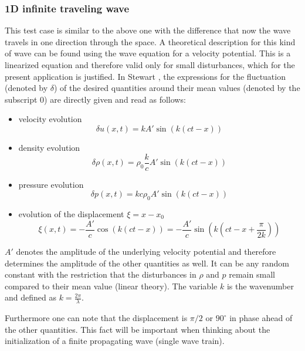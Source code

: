\documentclass{report}
\begin{document}
\subsubsection{1D infinite traveling wave}
This test case is similar to the above one with the difference that now the wave travels in one direction through the space. A theoretical description for this kind of wave can be found using the wave equation for a velocity potential. This is a linearized equation and therefore valid only for small disturbances, which for the present application is justified.
In Stewart \cite{Stewart1930}, the expressions for the fluctuation (denoted by $\delta$) of the desired quantities around their mean values (denoted by the subscript $0$) are directly given and read as follows:
\begin{itemize}
\item velocity evolution 
\begin{equation}
\label{eq:1DWaveDetla_u}
 \delta u(x,t)=k A' \sin(k(ct-x))
\end{equation}
\item density evolution 
\begin{equation}
 \delta \rho(x,t)=\rho_0\frac{k}{c} A'  \sin(k(ct-x))
\end{equation}
\item pressure evolution 
\begin{equation}
 \delta p(x,t)=k c \rho_0 A'  \sin(k(ct-x))
\end{equation}
\item evolution of the displacement $\xi=x-x_0$
\begin{equation}
\label{eq:1DWaveDisplacement}
 \xi(x,t)=-\frac{A' }{c} \cos(k(ct-x))=-\frac{A' }{c} \sin\left(k\left(ct-x+\frac{\pi}{2k}\right)\right)
\end{equation}

\end{itemize}

$A' $ denotes the amplitude of the underlying velocity potential and therefore determines the amplitude of the other quantities as well. It can be any random constant with the restriction that the disturbances in $\rho$ and $p$ remain small compared to their mean value (linear theory). The variable $k$ is the  wavenumber and defined as $k=\frac{2\pi}{\lambda}$.

Furthermore one can note that the displacement is $\pi/2$ or $90^\circ$ in phase ahead of the other quantities. This fact will be important when thinking about the initialization of a finite propagating wave (single wave train). 
\end{document}
